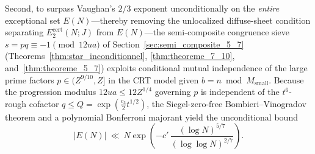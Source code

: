 \documentclass[11pt, a4paper]{article}
\theoremstyle{plain}
\theoremstyle{definition}
\begin{document}
Second, to surpass Vaughan's $2/3$ exponent unconditionally on the \emph{entire} exceptional set $E(N)$\allowbreak---thereby removing the unlocalized diffuse-sheet condition separating $E_2^{\mathrm{cert}}(N;\allowbreak J)$ from $E(N)$---the semi-composite congruence sieve $s=pq\equiv-1\pmod{12ua}$ of Section~\ref{sec:semi_composite_5_7} (Theorems~\ref{thm:star_inconditionnel}, \ref{thm:theoreme_7_10}, and~\ref{thm:theoreme_5_7}) exploits conditional mutual independence of the large prime factors $p\in(Z^{9/10},Z]$ in the CRT model given $b=n\bmod M_{\mathrm{small}}$. Because the progression modulus $12ua\le 12Z^{1/4}$ governing $p$ is independent of the $t^{6}$-rough cofactor $q\le Q=\exp(\frac{c_3}{2}t^{1/2})$, the Siegel-zero-free Bombieri--Vinogradov theorem and a polynomial Bonferroni majorant yield the unconditional bound
\[
|E(N)|\ \ll\ N\exp\!\left(-c'\,\frac{(\log N)^{5/7}}{(\log\log N)^{2/7}}\right).
\]
\end{document}
